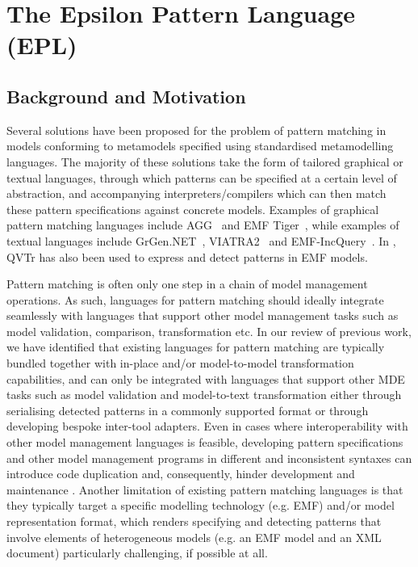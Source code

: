 \chapter{The Epsilon Pattern Language (EPL)}
\label{sec:EPL}

\section{Background and Motivation}
Several solutions have been proposed for the problem of pattern matching in models conforming to metamodels specified using standardised metamodelling languages. The majority of these solutions take the form of tailored graphical or textual languages, through which patterns can be specified at a certain level of abstraction, and accompanying interpreters/compilers which can then match these pattern specifications against concrete models. Examples of graphical pattern matching languages include AGG~\cite{AGG2004} and EMF Tiger~\cite{EMFTiger}, while examples of textual languages include GrGen.NET~\cite{GrGen}, VIATRA2~\cite{VIATRA2} and EMF-IncQuery~\cite{EMFIncQuery}. In \cite{QVTRPatterns}, QVTr has also been used to express and detect patterns in EMF models.

Pattern matching is often only one step in a chain of model management operations. As such, languages for pattern matching should ideally integrate seamlessly with languages that support other model management tasks such as model validation, comparison, transformation etc. In our review of previous work, we have identified that existing languages for pattern matching are typically bundled together with in-place and/or model-to-model transformation capabilities, and can only be integrated with languages that support other MDE tasks such as model validation and model-to-text transformation either through serialising detected patterns in a commonly supported format or through developing bespoke inter-tool adapters. Even in cases where interoperability with other model management languages is feasible, developing pattern specifications and other model management programs in different and inconsistent syntaxes can introduce code duplication and, consequently, hinder development and maintenance \cite{ICCECS09}. Another limitation of existing pattern matching languages is that they typically target a specific modelling technology (e.g. EMF) and/or model representation format, which renders specifying and detecting patterns that involve elements of heterogeneous models (e.g. an EMF model and an XML document) particularly challenging, if possible at all.

